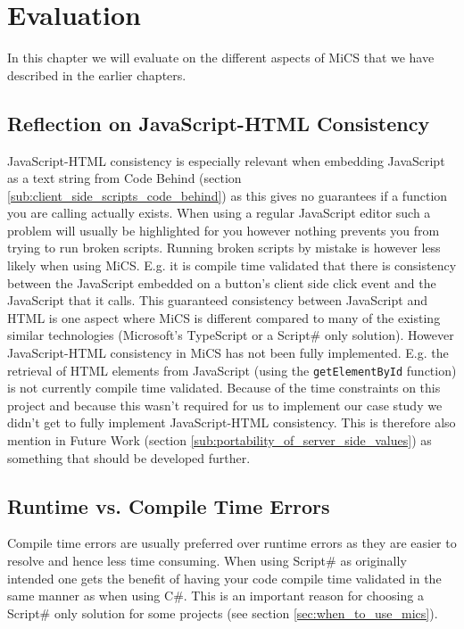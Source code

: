 \chapter{Evaluation}
	In this chapter we will evaluate on the different aspects of MiCS that we have described in the earlier chapters.







\section{Reflection on JavaScript-HTML Consistency} %
\label{sec:reflection_on_server_client_consistency}
	JavaScript-HTML consistency is especially relevant when embedding JavaScript as a text string from Code Behind (section \ref{sub:client_side_scripts_code_behind}) as this gives no guarantees if a function you are calling actually exists. When using a regular JavaScript editor such a problem will usually be highlighted for you however nothing prevents you from trying to run broken scripts. Running broken scripts by mistake is however less likely when using MiCS. E.g. it is compile time validated that there is consistency between the JavaScript embedded on a button’s client side click event and the JavaScript that it calls. This guaranteed consistency between JavaScript and HTML is one aspect where MiCS is different compared to many of the existing similar technologies (Microsoft’s TypeScript or a Script\# only solution). However JavaScript-HTML consistency in MiCS has not been fully implemented. E.g. the retrieval of HTML elements from JavaScript (using the \texttt{getElementById} function) is not currently compile time validated. Because of the time constraints on this project and because this wasn’t required for us to implement our case study we didn’t  get to fully implement JavaScript-HTML consistency. This is therefore also mention in Future Work (section \ref{sub:portability_of_server_side_values}) as something that should be developed further.

\section{Runtime vs. Compile Time Errors} %
\label{sec:runtime_vs_compile_time_errors}
	Compile time errors are usually preferred over runtime errors as they are easier to resolve and hence less time consuming. When using Script\# as originally intended one gets the benefit of having your code compile time validated in the same manner as when using C\#. This is an important reason for choosing a Script\# only solution for some projects (see section \ref{sec:when_to_use_mics}).

